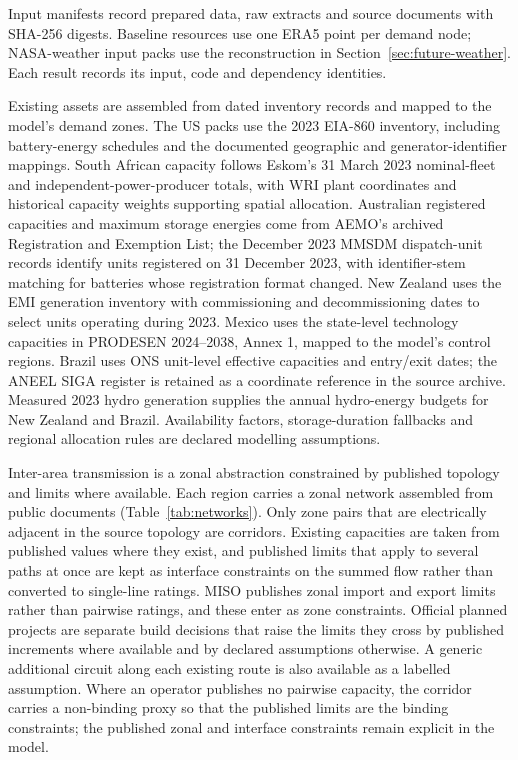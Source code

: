 \documentclass[pdflatex,sn-nature]{sn-jnl}
\begin{document}
Input manifests record prepared data, raw extracts and source documents with SHA-256 digests. Baseline resources use one ERA5 point per demand node; NASA-weather input packs use the reconstruction in Section~\ref{sec:future-weather}. Each result records its input, code and dependency identities.

Existing assets are assembled from dated inventory records and mapped to the model's demand zones. The US packs use the 2023 EIA-860 inventory, including battery-energy schedules and the documented geographic and generator-identifier mappings. South African capacity follows Eskom's 31 March 2023 nominal-fleet and independent-power-producer totals, with WRI plant coordinates and historical capacity weights supporting spatial allocation\cite{wrigppd}. Australian registered capacities and maximum storage energies come from AEMO's archived Registration and Exemption List; the December 2023 MMSDM dispatch-unit records identify units registered on 31 December 2023, with identifier-stem matching for batteries whose registration format changed. New Zealand uses the EMI generation inventory with commissioning and decommissioning dates to select units operating during 2023. Mexico uses the state-level technology capacities in PRODESEN 2024--2038, Annex 1, mapped to the model's control regions. Brazil uses ONS unit-level effective capacities and entry/exit dates; the ANEEL SIGA register is retained as a coordinate reference in the source archive. Measured 2023 hydro generation supplies the annual hydro-energy budgets for New Zealand and Brazil. Availability factors, storage-duration fallbacks and regional allocation rules are declared modelling assumptions.

Inter-area transmission is a zonal abstraction constrained by published topology and limits where available. Each region carries a zonal network assembled from public documents (Table~\ref{tab:networks}). Only zone pairs that are electrically adjacent in the source topology are corridors. Existing capacities are taken from published values where they exist, and published limits that apply to several paths at once are kept as interface constraints on the summed flow rather than converted to single-line ratings. MISO publishes zonal import and export limits rather than pairwise ratings, and these enter as zone constraints. Official planned projects are separate build decisions that raise the limits they cross by published increments where available and by declared assumptions otherwise. A generic additional circuit along each existing route is also available as a labelled assumption. Where an operator publishes no pairwise capacity, the corridor carries a non-binding proxy so that the published limits are the binding constraints; the published zonal and interface constraints remain explicit in the model.
\end{document}
